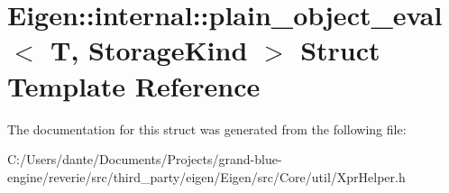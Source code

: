 \hypertarget{struct_eigen_1_1internal_1_1plain__object__eval}{}\section{Eigen\+::internal\+::plain\+\_\+object\+\_\+eval$<$ T, Storage\+Kind $>$ Struct Template Reference}
\label{struct_eigen_1_1internal_1_1plain__object__eval}


The documentation for this struct was generated from the following file\+:\begin{DoxyCompactItemize}
\item 
C\+:/\+Users/dante/\+Documents/\+Projects/grand-\/blue-\/engine/reverie/src/third\+\_\+party/eigen/\+Eigen/src/\+Core/util/Xpr\+Helper.\+h\end{DoxyCompactItemize}
